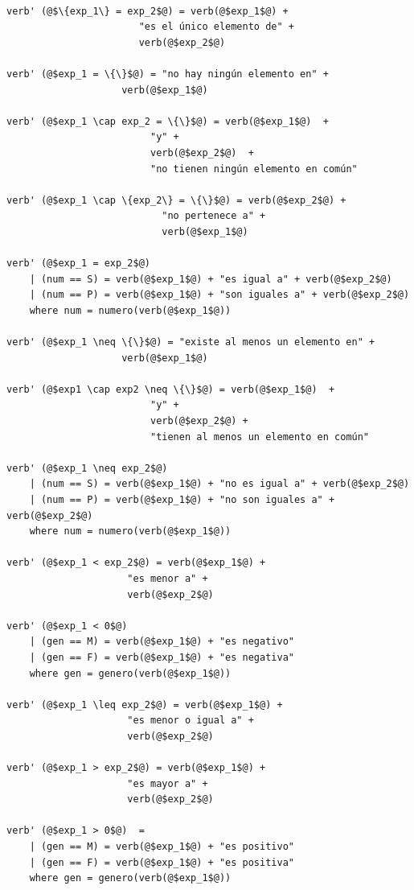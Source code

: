 \newpage 
\begin{mdframed}[style=codebox]
\begin{verbatim}

verb' (@$\{exp_1\} = exp_2$@) = verb(@$exp_1$@) + 
                       "es el único elemento de" + 
                       verb(@$exp_2$@)

verb' (@$exp_1 = \{\}$@) = "no hay ningún elemento en" + 
                    verb(@$exp_1$@) 

verb' (@$exp_1 \cap exp_2 = \{\}$@) = verb(@$exp_1$@)  +  
                         "y" +  
                         verb(@$exp_2$@)  +  
                         "no tienen ningún elemento en común"

verb' (@$exp_1 \cap \{exp_2\} = \{\}$@) = verb(@$exp_2$@) +  
                           "no pertenece a" +  
                           verb(@$exp_1$@) 

verb' (@$exp_1 = exp_2$@)
    | (num == S) = verb(@$exp_1$@) + "es igual a" + verb(@$exp_2$@) 
    | (num == P) = verb(@$exp_1$@) + "son iguales a" + verb(@$exp_2$@) 
    where num = numero(verb(@$exp_1$@))

verb' (@$exp_1 \neq \{\}$@) = "existe al menos un elemento en" +  
                    verb(@$exp_1$@) 

verb' (@$exp1 \cap exp2 \neq \{\}$@) = verb(@$exp_1$@)  +  
                         "y" +  
                         verb(@$exp_2$@) +  
                         "tienen al menos un elemento en común" 

verb' (@$exp_1 \neq exp_2$@)
    | (num == S) = verb(@$exp_1$@) + "no es igual a" + verb(@$exp_2$@) 
    | (num == P) = verb(@$exp_1$@) + "no son iguales a" + verb(@$exp_2$@) 
    where num = numero(verb(@$exp_1$@))

verb' (@$exp_1 < exp_2$@) = verb(@$exp_1$@) +  
                     "es menor a" +  
                     verb(@$exp_2$@) 

verb' (@$exp_1 < 0$@)
    | (gen == M) = verb(@$exp_1$@) + "es negativo" 
    | (gen == F) = verb(@$exp_1$@) + "es negativa" 
    where gen = genero(verb(@$exp_1$@))
                                 
verb' (@$exp_1 \leq exp_2$@) = verb(@$exp_1$@) +  
                     "es menor o igual a" +  
                     verb(@$exp_2$@) 

verb' (@$exp_1 > exp_2$@) = verb(@$exp_1$@) +  
                     "es mayor a" +  
                     verb(@$exp_2$@) 

verb' (@$exp_1 > 0$@)  =
    | (gen == M) = verb(@$exp_1$@) + "es positivo" 
    | (gen == F) = verb(@$exp_1$@) + "es positiva" 
    where gen = genero(verb(@$exp_1$@))


\end{verbatim}
\end{mdframed}
